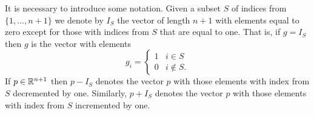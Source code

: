 \documentclass[final,leqno]{siamltex}
\begin{document}
\newcommand{\rng}{\operatorname{rng}}
\newcommand{\subrng}{\operatorname{subr}}
\newcommand{\decrng}{\operatorname{decrng}}

It is necessary to introduce some notation.  Given a subset $S$ of indices from $\{1,\dots,n+1\}$ we denote by $I_S$ the vector of length $n+1$ with elements equal to zero except for those with indices from $S$ that are equal to one.  That is, if $g = I_S$ then $g$ is the vector with elements
\[
g_i = \begin{cases}
1 & i \in S\\
0 & i \notin S.
\end{cases}
\]
If $p \in {\mathbb R}^{n+1}$ then $p - I_S$ denotes the vector $p$ with those elements with index from $S$ decremented by one.  Similarly, $p + I_S$ denotes the vector $p$ with those elements with index from $S$ incremented by one.
\end{document}
